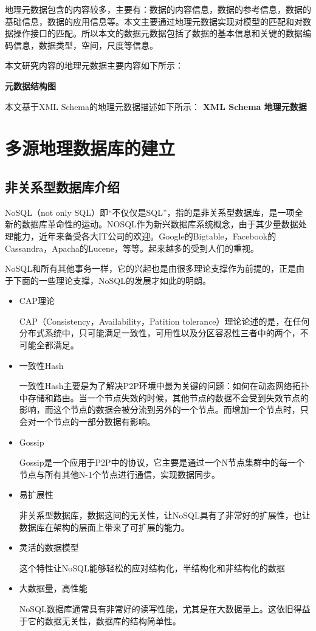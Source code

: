 \documentclass[master]{njnuthesis}
\begin{document}
地理元数据包含的内容较多，主要有：数据的内容信息，数据的参考信息，数据的基础信息，数据的应用信息等。本文主要通过地理元数据实现对模型的匹配和对数据操作接口的匹配。所以本文的数据元数据包括了数据的基本信息和关键的数据编码信息，数据类型，空间，尺度等信息。

本文研究内容的地理元数据主要内容如下所示：

\textbf{元数据结构图}

本文基于XML Schema的地理元数据描述如下所示：
\textbf{XML Schema 地理元数据}



\section{多源地理数据库的建立}
\subsection{非关系型数据库介绍}
NoSQL（not only SQL）即“不仅仅是SQL”，指的是非关系型数据库，是一项全新的数据库革命性的运动。NOSQL作为新兴数据库系统概念，由于其少量数据处理能力，近年来备受各大IT公司的欢迎。Google的Bigtable，Facebook的Cassandra，Apacha的Lucene，等等。起来越多的受到人们的重视。

NoSQL和所有其他事务一样，它的兴起也是由很多理论支撑作为前提的，正是由于下面的一些理论支撑，NoSQL的发展才如此的明朗。
\begin{itemize}
\item{CAP理论}

CAP（Consistency，Availability，Patition tolerance）理论论述的是，在任何分布式系统中，只可能满足一致性，可用性以及分区容忍性三者中的两个，不可能全都满足。
\item 一致性Hash

一致性Hash主要是为了解决P2P环境中最为关键的问题：如何在动态网络拓扑中存储和路由。当一个节点失效的时候，其他节点的数据不会受到失效节点的影响，而这个节点的数据会被分流到另外的一个节点。而增加一个节点时，只会对一个节点的一部分数据有影响。
\item Gossip

Gossip是一个应用于P2P中的协议，它主要是通过一个N节点集群中的每一个节点与所有其他N-1个节点进行通信，实现数据同步。

\item 易扩展性

非关系型数据库，数据这间的无关性，让NoSQL具有了非常好的扩展性，也让数据库在架构的层面上带来了可扩展的能力。
\item 灵活的数据模型

这个特性让NoSQL能够轻松的应对结构化，半结构化和非结构化的数据
\item 大数据量，高性能

NoSQL数据库通常具有非常好的读写性能，尤其是在大数据量上。这依旧得益于它的数据无关性，数据库的结构简单性。
\end{itemize}
\end{document}
